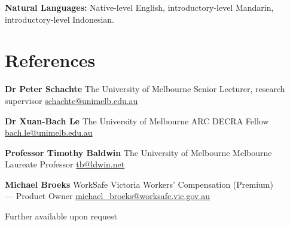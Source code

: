 \documentclass[9pt]{extarticle}
\newcommand{\reference}[5]{
    \textbf{#1} \newline
    {\footnotesize #2} \newline
    #3 \newline
    \href{mailto:#4}{#4} \newline
}
\newcommand{\skills}[2]{
    \textbf{#1} \newline
    #2
}
\begin{document}
\begin{minipage}[t]{.31\textwidth}
\skills{Natural Languages:}
{Native-level English, introductory-level Mandarin, introductory-level Indonesian.}

\medskip

\section{References}

\reference{Dr Peter Schachte}
{The University of Melbourne}
{Senior Lecturer, research supervisor}
{schachte@unimelb.edu.au}
\vspace

\reference{Dr Xuan-Bach Le}
{The University of Melbourne}
{ARC DECRA Fellow}
{bach.le@unimelb.edu.au}
\vspace

\reference{Professor Timothy Baldwin}
{The University of Melbourne}
{Melbourne Laureate Professor}
{tb@ldwin.net}
\vspace

\reference{Michael Broeks}
{WorkSafe Victoria}
{Workers' Compensation (Premium) \\ --- Product Owner}
{michael\_broeks@worksafe.vic.gov.au}
\vspace


{\footnotesize Further available upon request}

\end{minipage}\hfill
\end{document}
